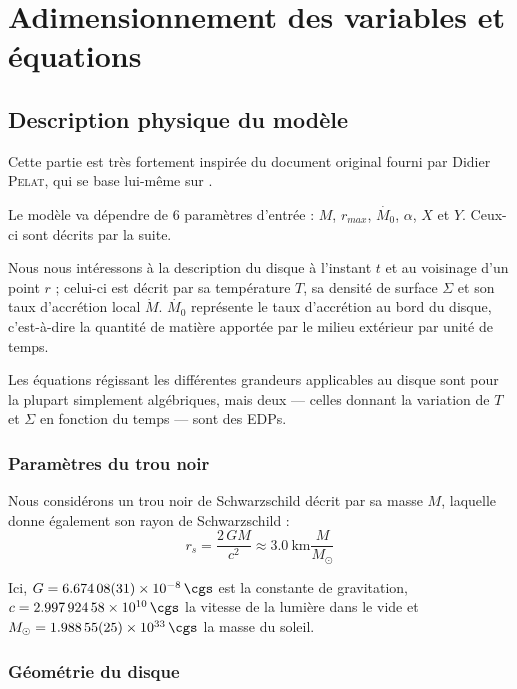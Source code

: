 \section{Adimensionnement des variables et équations}

\subsection{Description physique du modèle}

Cette partie est très fortement inspirée du document original fourni par Didier
\textsc{Pelat}, qui se base lui-même sur \citet{1984}.

Le modèle va dépendre de 6 paramètres d’entrée : $M$, $r_{max}$, $\dot{M_0}$,
$\alpha$, $X$ et $Y$. Ceux-ci sont décrits par la suite.

Nous nous intéressons à la description du disque à l’instant $t$ et au
voisinage d’un point $r$ ; celui-ci est décrit par sa température $T$, sa
densité de surface $\Sigma$ et son taux d’accrétion local $\dot{M}$.
$\dot{M_0}$ représente le taux d’accrétion au bord du disque, c’est-à-dire la
quantité de matière apportée par le milieu extérieur par unité de temps.

Les équations régissant les différentes grandeurs applicables au disque sont
pour la plupart simplement algébriques, mais deux — celles donnant la variation
de $T$ et $\Sigma$ en fonction du temps — sont des EDPs.

\subsubsection{Paramètres du trou noir}

Nous considérons un trou noir de Schwarzschild décrit par sa masse $M$,
laquelle donne également son rayon de Schwarzschild :
\begin{equation}
    \label{eq:rayon_schwarzschild}
    r_s = \frac{\num{2}\, G M}{c^2} \approx \SI{3.0}{\kilo\meter} \frac{M}{M_{\odot}}
\end{equation}

Ici, $G = \SI{6.67408(31)d-8}{\cgs}$ est la
constante de gravitation, $c = \SI{2.99792458e10}{\cgs}$ la
vitesse de la lumière dans le vide et $M_{\odot} = \SI{1.98855(25)d33}{\cgs}$
la masse du soleil.

\subsubsection{Géométrie du disque}

